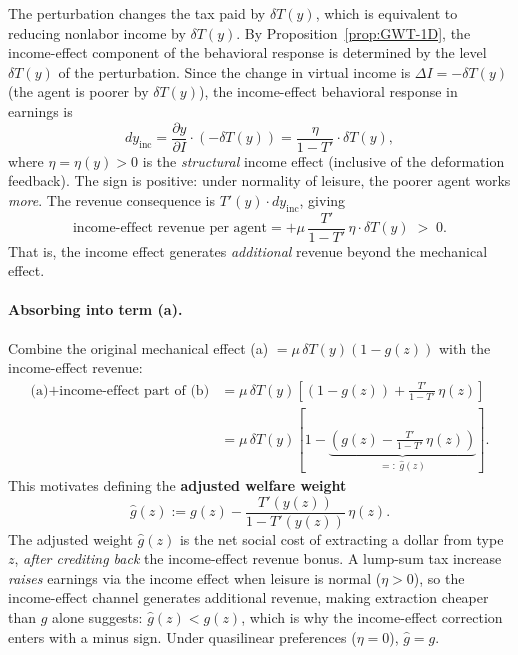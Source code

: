 \documentclass[12pt,a4paper]{article}
\theoremstyle{definition}
\theoremstyle{plain}
\theoremstyle{remark}
\begin{document}
The perturbation changes the tax paid by $\delta T(y)$, which is equivalent to reducing nonlabor income by $\delta T(y)$.  By Proposition~\ref{prop:GWT-1D}, the income-effect component of the behavioral response is determined by the level $\delta T(y)$ of the perturbation.  Since the change in virtual income is $\Delta I = -\delta T(y)$ (the agent is poorer by $\delta T(y)$), the income-effect behavioral response in earnings is
\[
  dy_{\text{inc}}
  = \frac{\partial y}{\partial I}\cdot(-\delta T(y))
  = \frac{\eta}{1-T'}\cdot\delta T(y),
\]
where $\eta = \eta(y) > 0$ is the \emph{structural} income effect (inclusive of the deformation feedback).  The sign is positive: under normality of leisure, the poorer agent works \emph{more}.  The revenue consequence is $T'(y)\cdot dy_{\text{inc}}$, giving
\[
  \text{income-effect revenue per agent}
  = +\mu\,\frac{T'}{1-T'}\,\eta\cdot\delta T(y) \;>\; 0.
\]
That is, the income effect generates \emph{additional} revenue beyond the mechanical effect.

\paragraph{Absorbing into term (a).}
Combine the original mechanical effect (a) $= \mu\,\delta T(y)(1-g(z))$ with the income-effect revenue:
\begin{align*}
  \text{(a)} + \text{income-effect part of (b)}
  &= \mu\,\delta T(y)\!\left[(1-g(z)) + \frac{T'}{1-T'}\,\eta(z)\right] \\
  &= \mu\,\delta T(y)\!\left[1 - \underbrace{\left(g(z) - \frac{T'}{1-T'}\,\eta(z)\right)}_{\displaystyle =:\;\hat g(z)}\right].
\end{align*}
This motivates defining the \textbf{adjusted welfare weight}
\begin{equation}
\label{eq:ghat-pert}
  \hat g(z) := g(z) - \frac{T'(y(z))}{1-T'(y(z))}\,\eta(z).
\end{equation}
The adjusted weight $\hat g(z)$ is the net social cost of extracting a dollar from type $z$, \emph{after crediting back} the income-effect revenue bonus.  A lump-sum tax increase \emph{raises} earnings via the income effect when leisure is normal ($\eta > 0$), so the income-effect channel generates additional revenue, making extraction cheaper than $g$ alone suggests: $\hat g(z) < g(z)$, which is why the income-effect correction enters with a minus sign.  Under quasilinear preferences ($\eta = 0$), $\hat g = g$.
\end{document}

